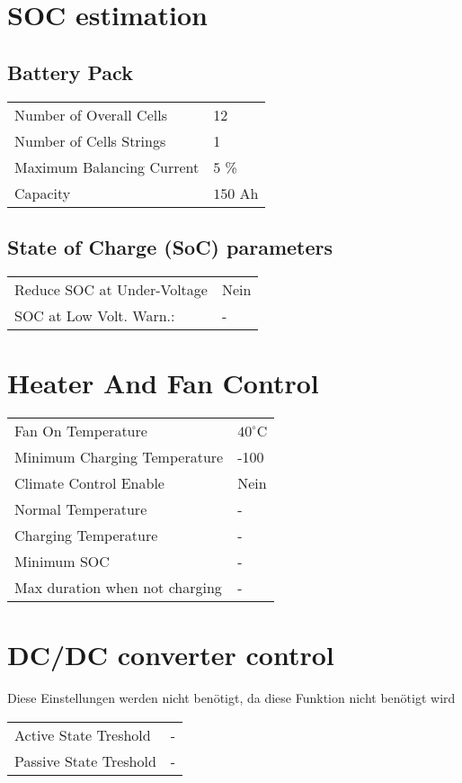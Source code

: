 \section*{SOC estimation}
\subsection*{Battery Pack}
\begin{tabular}{p{11cm}p{2cm}}
	Number of Overall Cells & 12 \\
	Number of Cells Strings & 1 \\
	Maximum Balancing Current & $5$ \% \\
	Capacity & $150$ Ah
\end{tabular}

\subsection*{State of Charge (SoC) parameters}
\begin{tabular}{p{11cm}p{2cm}}
	Reduce SOC at Under-Voltage & Nein \\
	SOC at Low Volt. Warn.: & -
\end{tabular}

\section*{Heater And Fan Control}
\begin{tabular}{p{11cm}p{2cm}}
	Fan On Temperature & $40^\circ$C \\
	Minimum Charging Temperature & -100 \\
	Climate Control Enable & Nein \\
	Normal Temperature & - \\
	Charging Temperature & - \\
	Minimum SOC & - \\
	Max duration when not charging & -
\end{tabular}

\section*{DC/DC converter control}
Diese Einstellungen werden nicht benötigt, da diese Funktion nicht benötigt wird \\
\begin{tabular}{p{11cm}p{2cm}}
	Active State Treshold & - \\
	Passive State Treshold & -
\end{tabular}

